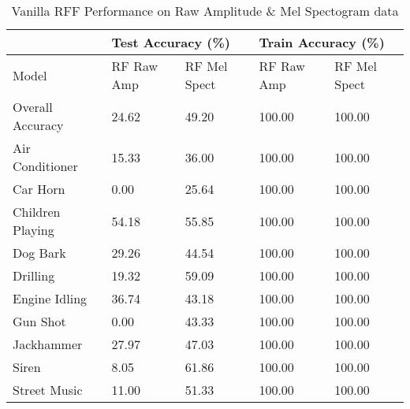 \documentclass[11pt]{article}
\begin{document}
\begin{table}[h!]
\centering
\begin{tabular}{lllll}
& \multicolumn{2}{l}{Test Accuracy (\%)} & \multicolumn{2}{l}{Train Accuracy (\%)} \\ \toprule
Model            & RF Raw Amp        & RF Mel Spect       & RF Raw Amp        & RF Mel Spect        \\ \toprule
Overall Accuracy & 24.62             & 49.20              & 100.00            & 100.00              \\ \midrule
Air Conditioner  & 15.33             & 36.00              & 100.00            & 100.00              \\
Car Horn         & 0.00              & 25.64              & 100.00            & 100.00              \\
Children Playing & 54.18             & 55.85              & 100.00            & 100.00              \\
Dog Bark         & 29.26             & 44.54              & 100.00            & 100.00              \\
Drilling         & 19.32             & 59.09              & 100.00            & 100.00              \\
Engine Idling    & 36.74             & 43.18              & 100.00            & 100.00              \\
Gun Shot         & 0.00              & 43.33              & 100.00            & 100.00              \\
Jackhammer       & 27.97             & 47.03              & 100.00            & 100.00              \\
Siren            & 8.05              & 61.86              & 100.00            & 100.00              \\
Street Music     & 11.00             & 51.33              & 100.00            & 100.00              \\ \bottomrule
\end{tabular}

\caption{\label{tab:3} Vanilla RFF Performance on Raw Amplitude \& Mel Spectogram data}
\end{table}

\end{document}
